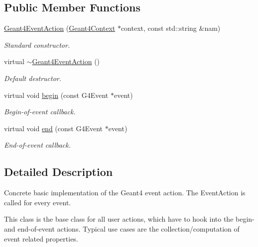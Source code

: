 \subsection*{Public Member Functions}
\begin{DoxyCompactItemize}
\item 
\hyperlink{class_d_d4hep_1_1_simulation_1_1_geant4_event_action_a334ced1ec29142af052446eb57c12dd1}{Geant4EventAction} (\hyperlink{class_d_d4hep_1_1_simulation_1_1_geant4_context}{Geant4Context} $\ast$context, const std::string \&nam)
\begin{DoxyCompactList}\small\item\em Standard constructor. \item\end{DoxyCompactList}\item 
virtual \hyperlink{class_d_d4hep_1_1_simulation_1_1_geant4_event_action_aa9e00290e866cfe1f2f471ecdd069291}{$\sim$Geant4EventAction} ()
\begin{DoxyCompactList}\small\item\em Default destructor. \item\end{DoxyCompactList}\item 
virtual void \hyperlink{class_d_d4hep_1_1_simulation_1_1_geant4_event_action_ad10785d157fa962f4ef2a5361bb0f5da}{begin} (const G4Event $\ast$event)
\begin{DoxyCompactList}\small\item\em Begin-\/of-\/event callback. \item\end{DoxyCompactList}\item 
virtual void \hyperlink{class_d_d4hep_1_1_simulation_1_1_geant4_event_action_af131bad73c28da3419af7c29e0b8c250}{end} (const G4Event $\ast$event)
\begin{DoxyCompactList}\small\item\em End-\/of-\/event callback. \item\end{DoxyCompactList}\end{DoxyCompactItemize}


\subsection{Detailed Description}
Concrete basic implementation of the Geant4 event action. The EventAction is called for every event.

This class is the base class for all user actions, which have to hook into the begin-\/ and end-\/of-\/event actions. Typical use cases are the collection/computation of event related properties.


